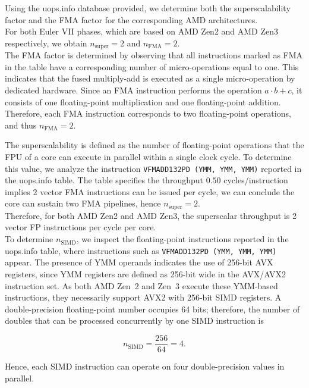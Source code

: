 \documentclass[unicode,10pt,a4paper,oneside,numbers=endperiod,openany]{scrartcl}
\begin{document}
Using the uops.info database provided, we determine both the superscalability factor and the FMA factor for the corresponding AMD architectures. \\
For both Euler VII phases, which are based on AMD Zen2 and AMD Zen3 respectively, we obtain $n_{\text{super}} = 2$ and $n_{\text{FMA}} = 2$.\\

The FMA factor is determined by observing that all instructions marked as FMA in the table have a corresponding number of micro-operations equal to one. This indicates that the fused multiply-add is executed as a single micro-operation by dedicated hardware. Since an FMA instruction performs the operation $a \cdot b + c$, it consists of one floating-point multiplication and one floating-point addition. Therefore, each FMA instruction corresponds to two floating-point operations, and thus $n_{\text{FMA}} = 2$.

The superscalability is defined as the number of floating-point operations that the FPU of a core can execute in parallel within a single clock cycle. To determine this value, we analyze the instruction \texttt{VFMADD132PD (YMM, YMM, YMM)} reported in the uops.info table. The table specifies the throughput $0.50$ cycles/instruction implies 2 vector FMA instructions can be issued per cycle, we can conclude the core can sustain two FMA pipelines, hence $n_{\text{super}} = 2$.\\
Therefore, for both AMD Zen2 and AMD Zen3, the superscalar throughput is 2 vector FP instructions per cycle per core.\\

To determine $n_{\text{SIMD}}$, we inspect the floating-point instructions reported in the uops.info table, where instructions such as \texttt{VFMADD132PD (YMM, YMM, YMM)} appear. The presence of YMM operands indicates the use of 256-bit AVX registers, since YMM registers are defined as 256-bit wide in the AVX/AVX2 instruction set. As both AMD Zen~2 and Zen~3 execute these YMM-based instructions, they necessarily support AVX2 with 256-bit SIMD registers. A double-precision floating-point number occupies 64 bits; therefore, the number of doubles that can be processed concurrently by one SIMD instruction is

$$
n_{\text{SIMD}} = \frac{256}{64} = 4.
$$

Hence, each SIMD instruction can operate on four double-precision values in parallel.
\end{document}
